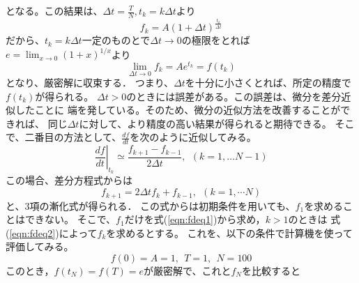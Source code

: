 \documentclass[10pt,a4j,dvipdfmx]{jarticle}
\begin{document}
となる。この結果は、$\Delta t= \frac{T}{N}, t_k=k\Delta t$より
\begin{equation}
	f_k=A\left(1+ \Delta t\right)^{\frac{t_k}{\Delta t}}
	\label{eqn:}
\end{equation}
だから、$t_k=k\Delta t$一定のものとで$\Delta t \rightarrow 0$の極限をとれば
$e=\lim_{x\rightarrow 0}(1+x)^{1/x}$より
\begin{equation}
	\lim _{\Delta t \rightarrow 0}f_k=Ae^{t_k}=f(t_k)
	\label{eqn:}
\end{equation}
となり、厳密解に収束する． 
つまり、$\Delta t$を十分に小さくとれば、所定の精度で$f(t_k)$が得られる。
$\Delta t>0$のときには誤差がある。この誤差は、微分を差分近似したことに
端を発している。そのため、微分の近似方法を改善することができれば、
同じ$\Delta t$に対して、より精度の高い結果が得られると期待できる。
そこで、二番目の方法として、$\frac{df}{dt}$を次のように近似してみる。
\begin{equation}
	\left. \frac{df}{dt} \right|_{t_k} \simeq 
	\frac{f_{k+1}-f_{k-1}}{2\Delta t}, \ \ (k=1,\dots N-1)
	\label{eqn:fd_2nd}
\end{equation}
この場合、差分方程式からは
\begin{equation}
	f_{k+1}= 2\Delta t f_k +f_{k-1}, \ \ (k=1,\cdots N)
	\label{eqn:fdeq2}
\end{equation}
と、3項の漸化式が得られる．
この式からは初期条件を用いても、$f_1$を求めることはできない。
そこで、$f_1$だけを式(\ref{eqn:fdeq1})から求め，$k>1$のときは
式(\ref{eqn:fdeq2})によって$f_k$を求めるとする。
これを、以下の条件で計算機を使って評価してみる。
\[
	f(0)=A=1, \ \ T=1, \ \ N=100
\]
このとき，$f(t_N)=f(T)=e$が厳密解で、これと$f_N$を比較すると
\end{document}

